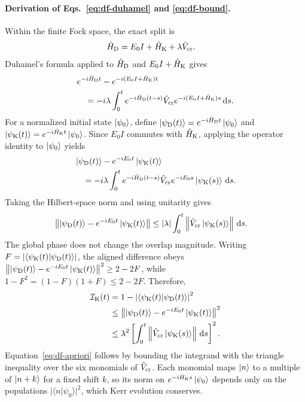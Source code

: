 \documentclass[pra,twocolumn,superscriptaddress,nofootinbib,floatfix]{revtex4-2}
\theoremstyle{remark}
\begin{document}
\paragraph{Derivation of Eqs.~\eqref{eq:df-duhamel} and \eqref{eq:df-bound}.}
Within the finite Fock space, the exact split is
\begin{align}
\hat H_{\rm D} &= E_0I+\hat H_{\rm K}+\lambda\hat V_{\rm cr}.
\end{align}
Duhamel's formula applied to \(\hat H_{\rm D}\) and \(E_0I+\hat H_{\rm K}\) gives
\begin{align}
&e^{-i\hat H_{\rm D}t}-e^{-i(E_0I+\hat H_{\rm K})t}\nonumber\\
&\quad=-i\lambda\int_0^t e^{-i\hat H_{\rm D}(t-s)}\hat V_{\rm cr}e^{-i(E_0I+\hat H_{\rm K})s}\,{\rm d}s.
\end{align}
For a normalized initial state \(\ket{\psi_0}\), define \(\ket{\psi_{\rm D}(t)}=e^{-i\hat H_{\rm D}t}\ket{\psi_0}\) and \(\ket{\psi_{\rm K}(t)}=e^{-i\hat H_{\rm K}t}\ket{\psi_0}\). Since \(E_0I\) commutes with \(\hat H_{\rm K}\), applying the operator identity to \(\ket{\psi_0}\) yields
\begin{align}
&\ket{\psi_{\rm D}(t)}-e^{-iE_0t}\ket{\psi_{\rm K}(t)}\nonumber\\
&\quad=-i\lambda\int_0^t e^{-i\hat H_{\rm D}(t-s)}\hat V_{\rm cr}e^{-iE_0s}\ket{\psi_{\rm K}(s)}\,{\rm d}s.
\end{align}
Taking the Hilbert-space norm and using unitarity gives
\begin{align}
\left\|\ket{\psi_{\rm D}(t)}-e^{-iE_0t}\ket{\psi_{\rm K}(t)}\right\| &\leq |\lambda|\int_0^t\left\|\hat V_{\rm cr}\ket{\psi_{\rm K}(s)}\right\|\,{\rm d}s.
\end{align}
The global phase does not change the overlap magnitude. Writing \(F=\left|\braket{\psi_{\rm K}(t)}{\psi_{\rm D}(t)}\right|\), the aligned difference obeys \(\left\|\ket{\psi_{\rm D}(t)}-e^{-iE_0t}\ket{\psi_{\rm K}(t)}\right\|^2\geq2-2F\), while \(1-F^2=(1-F)(1+F)\leq2-2F\). Therefore,
\begin{align}
\mathcal I_{\rm K}(t) &=1-\left|\braket{\psi_{\rm K}(t)}{\psi_{\rm D}(t)}\right|^2 \nonumber\\
&\leq \left\|\ket{\psi_{\rm D}(t)}-e^{-iE_0t}\ket{\psi_{\rm K}(t)}\right\|^2 \nonumber\\
&\leq \lambda^2\left[\int_0^t\left\|\hat V_{\rm cr}\ket{\psi_{\rm K}(s)}\right\|\,{\rm d}s\right]^2.
\end{align}
Equation~\eqref{eq:df-apriori} follows by bounding the integrand with the triangle inequality over the six monomials of \(\hat V_{\rm cr}\). Each monomial maps \(\ket n\) to a multiple of \(\ket{n+k}\) for a fixed shift \(k\), so its norm on \(e^{-i\hat H_{\rm K}s}\ket{\psi_0}\) depends only on the populations \(|\langle n|\psi_0\rangle|^2\), which Kerr evolution conserves.
\end{document}
